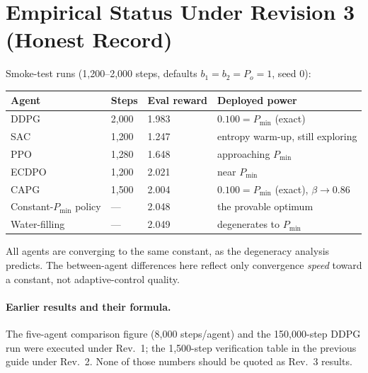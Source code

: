 \documentclass[11pt]{article}
\begin{document}
\section{Empirical Status Under Revision 3 (Honest Record)}
Smoke-test runs (1{,}200--2{,}000 steps, defaults $b_1{=}b_2{=}P_o{=}1$, seed 0):
\begin{center}
\renewcommand{\arraystretch}{1.25}
\begin{tabular}{@{}llll@{}}
\toprule
\textbf{Agent} & \textbf{Steps} & \textbf{Eval reward} & \textbf{Deployed power}\\
\midrule
DDPG  & 2{,}000 & 1.983 & $0.100 = P_{\min}$ (exact)\\
SAC   & 1{,}200 & 1.247 & entropy warm-up, still exploring\\
PPO   & 1{,}280 & 1.648 & approaching $P_{\min}$\\
ECDPO & 1{,}200 & 2.021 & near $P_{\min}$\\
\rowcolor{blue!8}
CAPG  & 1{,}500 & 2.004 & $0.100 = P_{\min}$ (exact), $\beta{\to}0.86$\\
\midrule
Constant-$P_{\min}$ policy & --- & 2.048 & the provable optimum\\
Water-filling & --- & 2.049 & degenerates to $P_{\min}$\\
\bottomrule
\end{tabular}
\end{center}
All agents are converging to the same constant, as the degeneracy analysis predicts. The
between-agent differences here reflect only convergence \emph{speed} toward a constant, not
adaptive-control quality.

\paragraph{Earlier results and their formula.} The five-agent comparison figure (8{,}000
steps/agent) and the 150{,}000-step DDPG run were executed under Rev.~1; the 1{,}500-step
verification table in the previous guide under Rev.~2. None of those numbers should be quoted as
Rev.~3 results.

\end{document}
